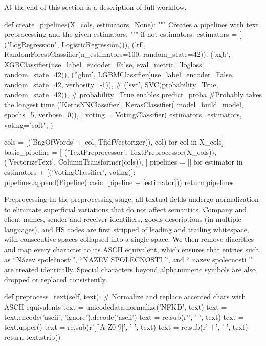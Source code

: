 At the end of this section is a description of full workflow.

\begtt {}
def create_pipelines(X_cols, estimators=None):
    """
    Creates a pipelines with text preprocessing and the given estimators.
    """
    if not estimators:
        estimators = [
            ("LogRegression", LogisticRegression()),
            ('rf', RandomForestClassifier(n_estimators=100, random_state=42)),
            ('xgb', XGBClassifier(use_label_encoder=False,
             eval_metric='logloss', random_state=42)),
            ('lgbm', LGBMClassifier(use_label_encoder=False,
             random_state=42, verbosity=-1)),
            # ('svc', SVC(probability=True, random_state=42)),
            # probability=True enables predict_proba
            #Probably takes the longest time
            ('KerasNNClassifier', KerasClassifier(
                model=build_model, epochs=5, verbose=0)),
        ]
    voting = VotingClassifier(
        estimators=estimators,
        voting="soft",
    )

    cols = [('BagOfWords' + col, TfidfVectorizer(), col) for col in X_cols]
    basic_pipeline = [
        ('TextPreprocessor', TextPreprocessor(X_cols)),
        ('VectorizeText', ColumnTransformer(cols)),
    ]
    pipelines = []
    for estimator in estimators + [('VotingClassifier', voting)]:
        pipelines.append(Pipeline(basic_pipeline + [estimator]))
    return pipelines
\endtt

\secc Preprocessing
In the preprocessing stage, all textual fields undergo normalization to eliminate superficial variations that do not affect semantics. Company and client names, sender and receiver identifiers, goods descriptions (in multiple languages), and HS codes are first stripped of leading and trailing whitespace, with consecutive spaces collapsed into a single space. We then remove diacritics and map every character to its ASCII equivalent, which ensures that entries such as “Název společnosti”, “NAZEV SPOLECNOSTI ”, and “ nazev       spolecnosti ” are treated identically. Special characters beyond alphanumeric symbols are also dropped or replaced consistently.

\begtt {}
def preprocess_text(self, text):
    # Normalize and replace accented chars with ASCII equivalents
    text = unicodedata.normalize('NFKD', text)
    text = text.encode('ascii', 'ignore').decode('ascii')
    text = re.sub(r'\s', ' ', text)
    text = text.upper()
    text = re.sub(r'[^A-Z0-9]', ' ', text)
    text = re.sub(r' +', ' ', text)
    return text.strip()
\endtt

